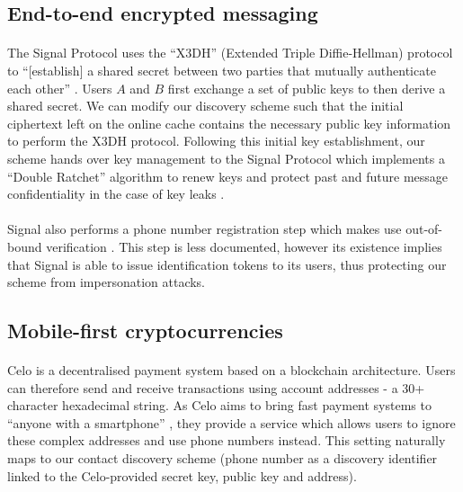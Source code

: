 	\subsection{End-to-end encrypted messaging}
	
	\paragraph{} The Signal Protocol uses the ``X3DH'' (Extended Triple Diffie-Hellman) protocol to ``[establish] a shared secret between two parties that mutually authenticate each other'' \cite{Signal:X3DH}. Users $A$ and $B$ first exchange a set of public keys to then derive a shared secret. We can modify our discovery scheme such that the initial ciphertext left on the online cache contains the necessary public key information to perform the X3DH protocol. Following this initial key establishment, our scheme hands over key management to the Signal Protocol which implements a ``Double Ratchet'' algorithm to renew keys and protect past and future message confidentiality in the case of key leaks \cite{Signal:Ratchet}. 
	
	\paragraph{} Signal also performs a phone number registration step which makes use out-of-bound verification \cite{Signal:Reg}. This step is less documented, however its existence implies that Signal is able to issue identification tokens to its users, thus protecting our scheme from impersonation attacks. 
	
	\subsection{Mobile-first cryptocurrencies}
	
	\paragraph{} Celo is a decentralised payment system based on a blockchain architecture. Users can therefore send and receive transactions using account addresses - a 30+ character hexadecimal string. As Celo aims to bring fast payment systems to ``anyone with a smartphone'' \cite{Celo:Doc}, they provide a service which allows users to ignore these complex addresses and use phone numbers instead. This setting naturally maps to our contact discovery scheme (phone number as a discovery identifier linked to the Celo-provided secret key, public key and address).
	
